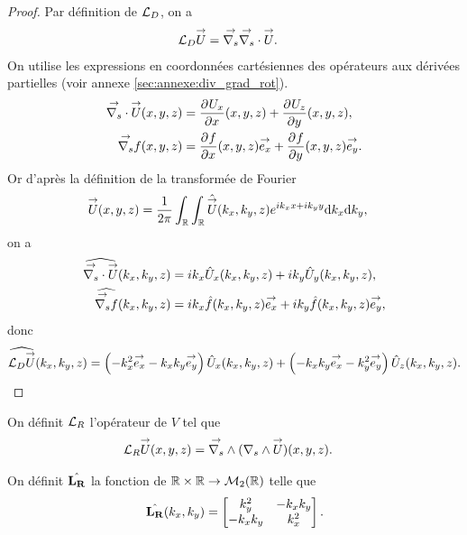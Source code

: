     \begin{proof}
      Par définition de \(\LD\), on a
      \begin{align*}
        \LD \vect{U} & = \vgrads{} \vdivs{} \vect{U}.
      \end{align*}
      On utilise les expressions en coordonnées cartésiennes des opérateurs aux dérivées partielles (voir annexe \ref{sec:annexe:div_grad_rot}).
      \begin{align*}
        \vdivs{\vect{U}}(x,y,z) &= \ddr{x}{U_x}(x,y,z) + \ddr{y}{U_z}(x,y,z),
        \\
        \vgrads{f}(x,y,z) &= \ddr{x}{f}(x,y,z)\vect{e_x} + \ddr{y}{f}(x,y,z)\vect{e_y}.
      \end{align*}
      Or d’après la définition de la transformée de Fourier
      \begin{align*}
        \vect{U}(x,y,z) & = \frac{1}{2\pi} \int_\RR \int_\RR \hat{\vect{U}}(k_x,k_y,z)e^{ik_xx + ik_yy}\dd{k_x}\dd{k_y},
      \end{align*}
      on a
      \begin{align*}
        \widehat{\vdivs{\vect{U}}}(k_x,k_y,z) &= ik_x{\hat{U}_x}(k_x,k_y,z) + ik_y{\hat{U}_y}(k_x,k_y,z),
        \\
        \widehat{\vgrads{f}}(k_x,k_y,z) &= ik_x\hat{f}(k_x,k_y,z)\vect{e_x} + ik_y\hat{f}(k_x,k_y,z)\vect{e_y},
      \end{align*}
      donc
      \begin{align*}
        \widehat{\LD{\vect{U}}}(k_x,k_y,z) =  \left(-k_x^2\vect{e_x} -k_xk_y\vect{e_y}\right){\hat{U}_x}(k_x,k_y,z) + \left(-k_xk_y\vect{e_x} - {k_y^2}\vect{e_y}\right){\hat{U}_z}(k_x,k_y,z).
      \end{align*}

    \end{proof}


    \begin{defn}
      \label{eq:plan:fourier:LR}

      On définit \(\LR\) l'opérateur de \(V\) tel que
      \begin{align*}
        \LR \vect{U}(x,y,z) & = \vrots{} (\rots{} \vect{U})(x,y,z).
      \end{align*}

      On définit \(\hat{\mLR}\) la fonction de \(\RR\times\RR \rightarrow \mathcal{M}_2(\RR)\) telle que
      \begin{equation*}
        \hat{\mLR}(k_x,k_y) = 
        \begin{bmatrix}
          k_y^2 & -k_xk_y
          \\
          -k_xk_y & k_x^2
        \end{bmatrix}.
      \end{equation*}
    \end{defn}

